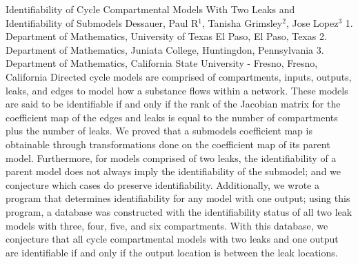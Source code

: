 \begin{addmargin}[2em]{0em}
\vspace{1.5ex}
\abs
{Identifiability of Cycle Compartmental Models With Two Leaks and Identifiability of Submodels}
{Dessauer, Paul R$^1$, Tanisha Grimsley$^2$, Jose Lopez$^3$}
{1. Department of Mathematics, University of Texas El Paso, El Paso, Texas 2. Department of Mathematics, Juniata College, Huntingdon, Pennsylvania 3. Department of Mathematics, California State University - Fresno, Fresno, California}
{Directed cycle models are comprised of compartments, inputs, outputs,
leaks, and edges to model how a substance flows within a network. These models are
said to be identifiable if and only if the rank of the Jacobian matrix for the coefficient
map of the edges and leaks is equal to the number of compartments plus the number of
leaks. We proved that a submodels coefficient map is obtainable through transformations done on the coefficient map of its parent model. Furthermore, for models comprised of two leaks, the identifiability of a parent model does not always imply the identifiability of the submodel; and we conjecture which cases do preserve identifiability. Additionally, we wrote a program that determines identifiability for any model with one output; using this program, a database was constructed with the identifiability status of all two leak models with three, four, five, and six compartments. With this database, we conjecture that all cycle compartmental models with two leaks and one output are identifiable if and only if the output location is between the leak locations.}

\end{addmargin}





